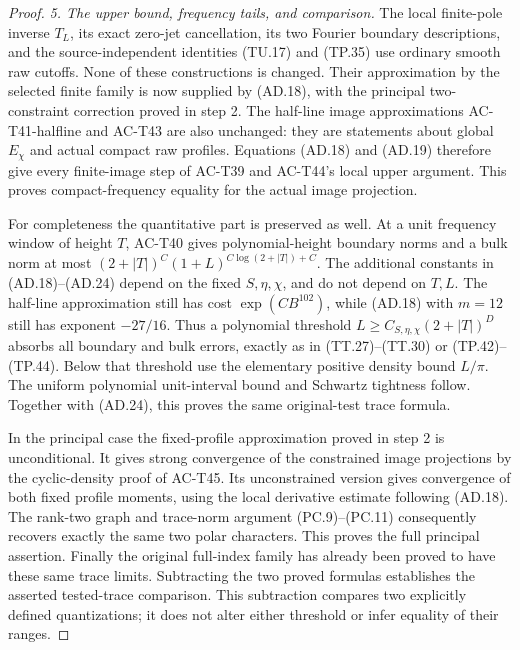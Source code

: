 \begin{proof}
\emph{5. The upper bound, frequency tails, and comparison.}
The local finite-pole inverse \(T_L\), its exact
zero-jet cancellation, its two Fourier boundary
descriptions, and the source-independent identities
(TU.17) and (TP.35) use ordinary smooth raw
cutoffs.  None of these constructions is changed.
Their approximation by the selected finite
family is now supplied by (AD.18), with the
principal two-constraint correction proved
in step 2.
The half-line image approximations AC-T41-halfline
and AC-T43 are also unchanged: they are statements
about global \(E_\chi\) and actual compact raw
profiles.  Equations (AD.18) and (AD.19)
therefore give every finite-image step of
AC-T39 and AC-T44's local upper argument.
This proves compact-frequency equality for
the actual image projection.

For completeness the quantitative part is
preserved as well.  At a unit frequency window
of height \(T\), AC-T40 gives polynomial-height
boundary norms and a bulk norm at most
\((2+|T|)^C(1+L)^{C\log(2+|T|)+C}\).
The additional constants in (AD.18)--(AD.24)
depend on the fixed \(S,\eta,\chi\), and do
not depend on \(T,L\).
The half-line approximation still has cost
\(\exp(C B^{102})\), while (AD.18) with
\(m=12\) still has exponent \(-27/16\).
Thus a polynomial threshold
\(L\geq C_{S,\eta,\chi}(2+|T|)^D\)
absorbs all boundary and bulk errors, exactly
as in (TT.27)--(TT.30) or (TP.42)--(TP.44).
Below that threshold use the elementary
positive density bound \(L/\pi\).
The uniform polynomial unit-interval bound
and Schwartz tightness follow.
Together with (AD.24), this proves the
same original-test trace formula.

In the principal case the fixed-profile
approximation proved in step 2 is unconditional.
It gives strong convergence of the constrained
image projections by the cyclic-density proof
of AC-T45.  Its unconstrained version gives
convergence of both fixed profile moments,
using the local derivative estimate following
(AD.18).  The rank-two graph and trace-norm
argument (PC.9)--(PC.11) consequently recovers
exactly the same two polar characters.
This proves the full principal assertion.
Finally the original full-index family has
already been proved to have these same trace
limits.  Subtracting the two proved formulas
establishes the asserted tested-trace comparison.
This subtraction compares two explicitly
defined quantizations; it does not alter either
threshold or infer equality of their ranges.
\end{proof}

